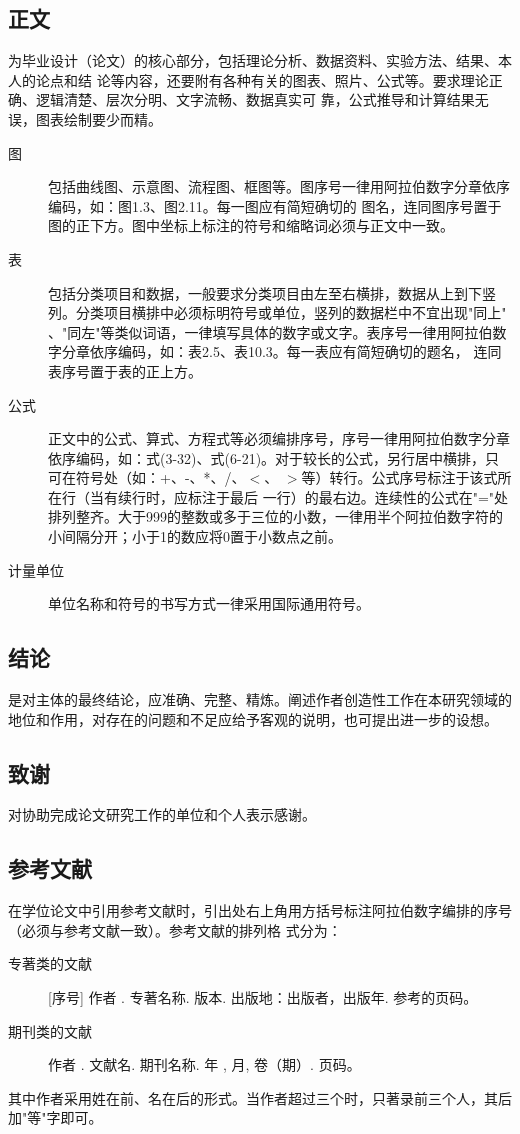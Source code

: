 \subsection{正文} 为毕业设计（论文）的核心部分，包括理论分析、数据资料、实验方法、结果、本人的论点和结
论等内容，还要附有各种有关的图表、照片、公式等。要求理论正确、逻辑清楚、层次分明、文字流畅、数据真实可
靠，公式推导和计算结果无误，图表绘制要少而精。
\begin{description}
  \item[图] 包括曲线图、示意图、流程图、框图等。图序号一律用阿拉伯数字分章依序编码，如：图1.3、图2.11。每一图应有简短确切的
      图名，连同图序号置于图的正下方。图中坐标上标注的符号和缩略词必须与正文中一致。
  \item[表] 包括分类项目和数据，一般要求分类项目由左至右横排，数据从上到下竖列。分类项目横排中必须标明符号或单位，竖列的数据栏中不宜出现"同上" 、"同左"等类似词语，一律填写具体的数字或文字。表序号一律用阿拉伯数字分章依序编码，如：表2.5、表10.3。每一表应有简短确切的题名，
      连同表序号置于表的正上方。
  \item[公式] 正文中的公式、算式、方程式等必须编排序号，序号一律用阿拉伯数字分章依序编码，如：式(3-32)、式(6-21)。对于较长的公式，另行居中横排，只可在符号处（如：+、-、*、/、$<$、 $>$等）转行。公式序号标注于该式所在行（当有续行时，应标注于最后 一行）的最右边。连续性的公式在"="处排列整齐。大于999的整数或多于三位的小数，一律用半个阿拉伯数字符的小间隔分开；小于1的数应将0置于小数点之前。
  \item[计量单位] 单位名称和符号的书写方式一律采用国际通用符号。
\end{description}

\subsection{结论}
是对主体的最终结论，应准确、完整、精炼。阐述作者创造性工作在本研究领域的地位和作用，对存在的问题和不足应给予客观的说明，也可提出进一步的设想。

\subsection{致谢}
对协助完成论文研究工作的单位和个人表示感谢。

\subsection{参考文献}
在学位论文中引用参考文献时，引出处右上角用方括号标注阿拉伯数字编排的序号（必须与参考文献一致）。参考文献的排列格
式分为：
\begin{description}
  \item[专著类的文献] [序号]  作者 . 专著名称.  版本. 出版地：出版者，出版年. 参考的页码。
  \item[期刊类的文献] 作者 . 文献名. 期刊名称.  年 , 月,  卷（期）. 页码。
\end{description}
其中作者采用姓在前、名在后的形式。当作者超过三个时，只著录前三个人，其后
加"等"字即可。

